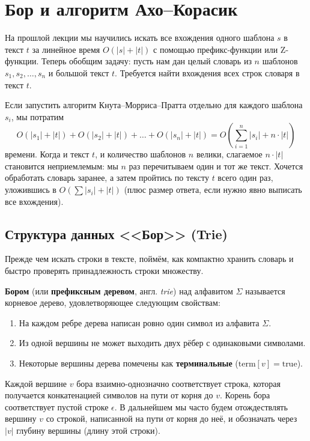 \section{Бор и алгоритм Ахо--Корасик}

На прошлой лекции мы научились искать все вхождения одного шаблона $s$ в текст $t$ за линейное время $O(|s| + |t|)$ с помощью префикс-функции или Z-функции. Теперь обобщим задачу: пусть нам дан целый словарь из $n$ шаблонов $s_1, s_2, \dots, s_n$ и большой текст $t$. Требуется найти вхождения всех строк словаря в текст $t$.

Если запустить алгоритм Кнута--Морриса--Пратта отдельно для каждого шаблона $s_i$, мы потратим
\[
    O(|s_1| + |t|) + O(|s_2| + |t|) + \dots + O(|s_n| + |t|) = O\!\left(\sum_{i=1}^n |s_i| + n \cdot |t|\right)
\]
времени. Когда и текст $t$, и количество шаблонов $n$ велики, слагаемое $n \cdot |t|$ становится неприемлемым: мы $n$ раз перечитываем один и тот же текст. Хочется обработать словарь заранее, а затем пройтись по тексту $t$ всего один раз, уложившись в $O\!\left(\sum |s_i| + |t|\right)$ (плюс размер ответа, если нужно явно выписать все вхождения).

\subsection{Структура данных <<Бор>> (Trie)}

Прежде чем искать строки в тексте, поймём, как компактно хранить словарь и быстро проверять принадлежность строки множеству.

\begin{definition}
    \textbf{Бором} (или \textbf{префиксным деревом}, англ. \textit{trie}) над алфавитом $\Sigma$ называется корневое дерево, удовлетворяющее следующим свойствам:
    \begin{enumerate}
        \item На каждом ребре дерева написан ровно один символ из алфавита $\Sigma$.
        \item Из одной вершины не может выходить двух рёбер с одинаковыми символами.
        \item Некоторые вершины дерева помечены как \textbf{терминальные} ($\text{term}[v] = \text{true}$).
    \end{enumerate}
\end{definition}

Каждой вершине $v$ бора взаимно-однозначно соответствует строка, которая получается конкатенацией символов на пути от корня до $v$. Корень бора соответствует пустой строке $\epsilon$. В дальнейшем мы часто будем отождествлять вершину $v$ со строкой, написанной на пути от корня до неё, и обозначать через $|v|$ глубину вершины (длину этой строки).

